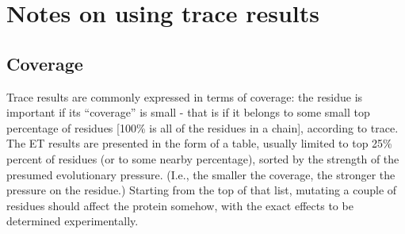 \section{Notes on using trace results}

\subsection{Coverage} Trace  results are commonly expressed in terms of coverage: the residue is
important if its ``coverage'' is small - that is if it belongs to some small top percentage of residues [100\% is
 all of the residues in a chain], according to trace.
The ET results are presented  in the form of a table, usually limited to top 25\%  percent of residues
(or to some nearby percentage), sorted by the strength of the presumed evolutionary pressure.
(I.e., the smaller the coverage, the stronger the pressure on the residue.) Starting from the top of that list,
mutating a couple of residues should affect the protein somehow, with the exact effects to be determined experimentally.